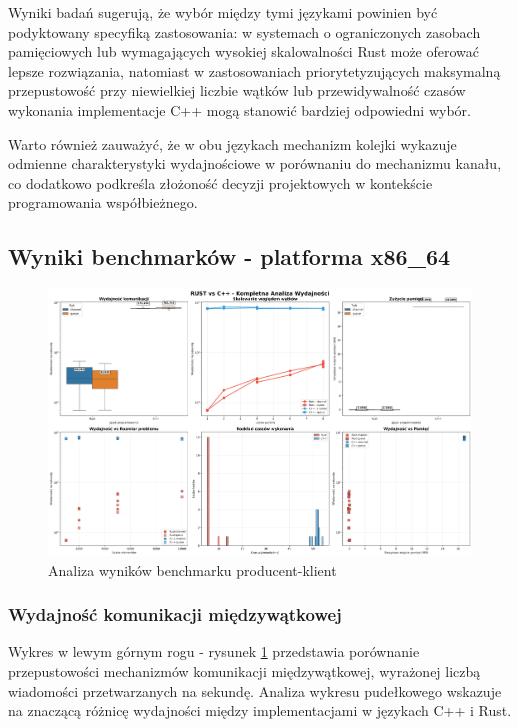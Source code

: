 Wyniki badań sugerują, że wybór między tymi językami powinien być podyktowany specyfiką zastosowania: w systemach o ograniczonych zasobach pamięciowych lub wymagających wysokiej skalowalności Rust może oferować lepsze rozwiązania, natomiast w zastosowaniach priorytetyzujących maksymalną przepustowość przy niewielkiej liczbie wątków lub przewidywalność czasów wykonania implementacje C++ mogą stanowić bardziej odpowiedni wybór.

Warto również zauważyć, że w obu językach mechanizm kolejki wykazuje odmienne charakterystyki wydajnościowe w porównaniu do mechanizmu kanału, co dodatkowo podkreśla złożoność decyzji projektowych w kontekście programowania współbieżnego.
\subsection{Wyniki benchmarków - platforma x86\_64}
\begin{figure}[H]
    \centering
    \includegraphics[width=\textwidth]{analiza/images/conc/pc/x86/mega_overview_2x3.png}
    \caption{Analiza wyników benchmarku producent-klient}
    \label{analiza_benchmarku_producent_klient_x86_64}
\end{figure}

\subsubsection{Wydajność komunikacji międzywątkowej}
Wykres w lewym górnym rogu - rysunek \ref{analiza_benchmarku_producent_klient_x86_64} przedstawia porównanie przepustowości mechanizmów komunikacji międzywątkowej, wyrażonej liczbą wiadomości przetwarzanych na sekundę. Analiza wykresu pudełkowego wskazuje na znaczącą różnicę wydajności między implementacjami w językach C++ i Rust.

